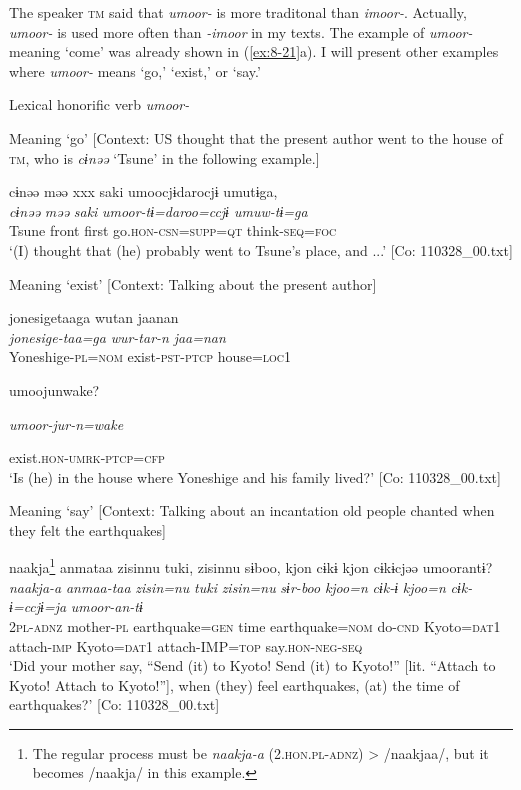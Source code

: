 The speaker \textsc{tm} said that \textit{umoor-} is more traditonal than \textit{imoor-}. Actually, \textit{umoor-} is used more often than \textit{-imoor} in my texts. The example of \textit{umoor-} meaning ‘come’ was already shown in (\ref{ex:8-21}a). I will present other examples where \textit{umoor-} means ‘go,’ ‘exist,’ or ‘say.’

\ea\label{ex:8-22}
  Lexical honorific verb \textit{umoor-}

\ea Meaning ‘go’ [Context: US thought that the present author went to the house of \textsc{tm}, who is \textit{cɨnəə} ‘Tsune’ in the following example.]

   {\US}
\glll   cɨnəə  məə  xxx  saki  umoocjɨdarocjɨ  umutɨga,\\
\textit{cɨnəə}  \textit{məə}    \textit{saki}  \textit{umoor-tɨ=daroo=ccjɨ  umuw-tɨ=ga}\\
Tsune  front    first  go.\textsc{hon}-\textsc{csn}=\textsc{supp}=\textsc{qt}  think-\textsc{seq}=\textsc{foc}\\
\glt ‘(I) thought that (he) probably went to Tsune’s place, and ...’ [Co: 110328\_00.txt]

\ex Meaning ‘exist’ [Context: Talking about the present author]

   {\US}
\glll   jonesigetaaga  wutan  jaanan\\
\textit{jonesige-taa=ga}  \textit{wur-tar-n}  \textit{jaa=nan}  \\
Yoneshige-\textsc{pl}=\textsc{nom}  exist-\textsc{pst}-\textsc{ptcp}  house=\textsc{loc}1

      umoojunwake?

      \textit{umoor-jur-n=wake}

      exist.\textsc{hon}-\textsc{umrk}-\textsc{ptcp}=\textsc{cfp}\\
\glt ‘Is (he) in the house where Yoneshige and his family lived?’ [Co: 110328\_00.txt]

\ex Meaning ‘say’ [Context: Talking about an incantation old people chanted when they felt the earthquakes]

{\TM}
\glll  naakja\footnote{The regular process must be \textit{naakja-a} (2.\textsc{hon}.\textsc{pl}-\textsc{adnz}) > /naakjaa/, but it becomes /naakja/ in this example.}  anmataa  zisinnu  tuki,  zisinnu  sɨboo,{\footnotemark}  kjon  cɨkɨ  kjon  cɨkɨcjəə  umoorantɨ?\\
\textit{naakja-a}  \textit{anmaa-taa}  \textit{zisin=nu}  \textit{tuki}  \textit{zisin=nu}  \textit{sɨr-boo}      \textit{kjoo=n}  \textit{cɨk-ɨ}  \textit{kjoo=n}  \textit{cɨk-ɨ=ccjɨ=ja}  \textit{umoor-an-tɨ}\\
2\textsc{pl}-\textsc{adnz}  mother-\textsc{pl}  earthquake=\textsc{gen}  time  earthquake=\textsc{nom}  do-\textsc{cnd}    Kyoto=\textsc{dat1}  attach-\textsc{imp}  Kyoto=\textsc{dat1}  attach-IMP=\textsc{top}  say.\textsc{hon}-\textsc{neg}-\textsc{seq}\\
\glt ‘Did your mother say, “Send (it) to Kyoto! Send (it) to Kyoto!” [lit. “Attach to Kyoto! Attach to Kyoto!”], when (they) feel earthquakes, (at) the time of earthquakes?’ [Co: 110328\_00.txt]
\z

